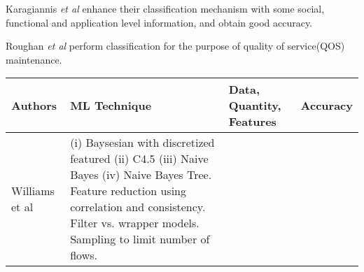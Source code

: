  Karagiannis
\emph{et al} \cite{karagiannis2005blinc} enhance their classification
mechanism with some social, functional and application level
information, and obtain good accuracy.  

Roughan \emph{et al}
\cite{roughan2004class} perform classification for the purpose of
quality of service(QOS) maintenance.


\begin{table}[htbp]
\begin{small}
\begin{tabular}{||p{30mm}|p{35mm}|p{25mm}|p{25 mm}||}
\hline
Authors & ML Technique & Data, Quantity, Features & Accuracy \\
\hline
\hline
Williams et al \cite{williams2006preliminary}  & 
(i) Baysesian with discretized featured (ii) C4.5 (iii) Naive Bayes (iv) Naive Bayes Tree.   Feature reduction using correlation and consistency. 
Filter vs. wrapper models.  Sampling to limit number of flows. 


\end{tabular}
\end{small}
\end{table}
